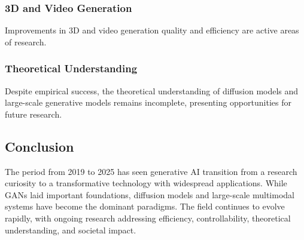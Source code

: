 \subsubsection*{3D and Video Generation}
Improvements in 3D and video generation quality and efficiency are active areas of research.

\subsubsection*{Theoretical Understanding}
Despite empirical success, the theoretical understanding of diffusion models and large-scale generative models remains incomplete, presenting opportunities for future research.

\subsection*{Conclusion}

The period from 2019 to 2025 has seen generative AI transition from a research curiosity to a transformative technology with widespread applications. While GANs laid important foundations, diffusion models and large-scale multimodal systems have become the dominant paradigms. The field continues to evolve rapidly, with ongoing research addressing efficiency, controllability, theoretical understanding, and societal impact.

